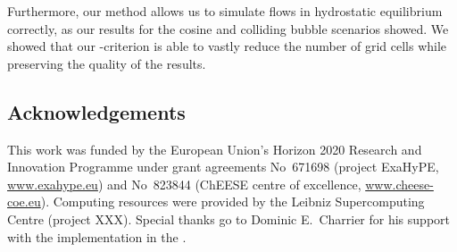 \documentclass[runningheads]{llncs}
\begin{document}
Furthermore, our method allows us to simulate flows in hydrostatic equilibrium correctly, as our results for the cosine and colliding bubble scenarios showed.
We showed that our \amr{}-criterion is able to vastly reduce the number of grid cells while preserving the quality of the results.

\subsection*{Acknowledgements}
This work was funded by the European Union’s Horizon 2020 Research and Innovation Programme under grant agreements 
No~671698 (project ExaHyPE, \url{www.exahype.eu}) and 
No~823844 (ChEESE centre of excellence, \url{www.cheese-coe.eu}).
Computing resources were provided by the Leibniz Supercomputing Centre (project XXX). 
Special thanks go to Dominic E.\ Charrier for his support with the implementation in the \exahypeengine{}.



\printbibliography{}
\end{document}
